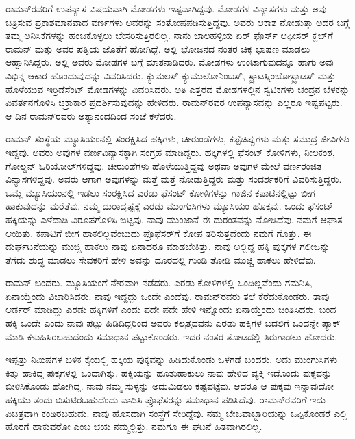 ರಾಮನ್‍ರವರಿಗೆ ಉಪನ್ಯಾಸ ವಿಷಯವಾಗಿ ಮೋಡಗಳು ಇಷ್ಟವಾಗಿದ್ದವು. ಮೋಡಗಳ ವಿನ್ಯಾಸಗಳು ಮತ್ತು ಅವು ಚಿತ್ರಿಸುವ ಪ್ರಕಾಶಮಾನವಾದ ವರ್ಣಗಳು ಅವರನ್ನು ಸಂತೋಷ\-ಪಡಿಸುತ್ತಿದ್ದವು. ಅವರು ಆಕಾಶ ನೋಡುತ್ತಾ ಅದರ ಬಗ್ಗೆ ತಮ್ಮ ಅನಿಸಿಕೆಗಳನ್ನು ಹಂಚಿಕೊಳ್ಳಲು ಬೇಸರಿಸುತ್ತಿರಲಿಲ್ಲ. ನಾನು ಜಾಲಹಳ್ಳಿಯ ಏರ್ ಫೊರ್ಸ್ ಆಫೀಸರ್ ಕ್ಲಬ್‌ಗೆ ರಾಮನ್ ಮತ್ತು ಅವರ ಪತ್ನಿಯ ಜೊತೆಗೆ ಹೋಗಿದ್ದೆ. ಅಲ್ಲಿ ಭೋಜನದ ನಂತರ ಚಿಕ್ಕ ಭಾಷಣ ಮಾಡಲು ಆಹ್ವಾನಿಸಿದ್ದರು. ಅಲ್ಲಿ ಅವರು ಮೋಡಗಳ ಬಗ್ಗೆ ಮಾತನಾಡಿದರು. ಮೋಡಗಳು ಉಂಟಾಗುವುದನ್ನೂ ಹಾಗು ಅವು ವಿಭಿನ್ನ ಆಕಾರ ಹೊಂದುವುದನ್ನು ವಿವರಿಸಿದರು. ಕ್ಯುಮಲಸ್ ಕ್ಯುಮುಲೋನಿಂಬಸ್, ಸ್ಟ್ರಾಟಸ್\break ನಿಂಬೋಸ್ಟ್ರಾಟಸ್ ಮತ್ತು ಹೊಳೆಯುವ ಇರ್ರಿಡೆಸೆಂಟ್ ಮೋಡಗಳನ್ನು ವಿವರಿಸಿದರು. ಅತಿ ಎತ್ತರದ ಮೋಡಗಳಲ್ಲಿನ ಸ್ವಟಿಕಗಳು ಚಂದ್ರನ ಬೆಳಕನ್ನು ವಿವರ್ತನಗೊಳಿಸಿ ಚಕ್ರಾಕಾರ ಪ್ರದರ್ಶಿಸುವುದನ್ನು ಹೇಳಿದರು. ರಾಮನ್‌ರವರ ಉಪನ್ಯಾಸವನ್ನು ಎಲ್ಲರೂ ಇಷ್ಟಪಟ್ಟರು. ಆ ದಿನ ರಾಮನ್‌ರವರು ಅತ್ಯಾನಂದದಿಂದ ಸಂಜೆ ಕಳೆದರು. 

ರಾಮನ್ ಸಂಸ್ಥೆಯ ಮ್ಯೂಸಿಯಂನಲ್ಲಿ ಸಂರಕ್ಷಿಸಿದ ಹಕ್ಕಿಗಳು, ಚೀರುಂಡೆಗಳು, ಕಪ್ಪೆಚಿಪ್ಪುಗಳು ಮತ್ತು ಸಮುದ್ರ ಜೀವಿಗಳು ಇದ್ದವು. ಅವರು ಅವುಗಳ ವರ್ಣವಿನ್ಯಾಸಕ್ಕಾಗಿ ಸಂಗ್ರಹ ಮಾಡಿದ್ದರು. ಹಕ್ಕಿಗಳಲ್ಲಿ ಫೆಸಂಟ್ ಕೋಳಿಗಳು, ನೀಲಕಂಠ, ಗೋಲ್ಡನ್ ಓರಿಯೋಲ್‌ಗಳಿದ್ದವು. ಚೀರುಂಡೆಗಳು ಹೊಳೆಯುತ್ತಿದ್ದವು ಅಥವಾ ಅವುಗಳ ಮೇಲೆ ವರ್ಣರಂಜಿತ ವಿನ್ಯಾಸಗಳಿದ್ದವು. ಅವರು ಆಗಾಗ ಅವುಗಳನ್ನು ಮತ್ತೆ ಮತ್ತೆ ನೋಡುತ್ತಿದ್ದರು ಮತ್ತು ಸಂದರ್ಶಕರಿಗೆ ವಿವರಿಸುತ್ತಿದ್ದರು. ಒಮ್ಮೆ ಮ್ಯೂಸಿಯಂನಲ್ಲಿ ಇಡಲು ಸಂರಕ್ಷಿಸಿದ ಎರಡು ಫೆಸಂಟ್ ಕೋಳಿಗಳನ್ನು ಗಾಜಿನ ಕಪಾಟಿನಲ್ಲಿಟ್ಟು ಬೀಗ ಹಾಕುವುದನ್ನು ಮರೆತೆವು. ನಮ್ಮ ದುರಾದೃಷ್ಟಕ್ಕೆ ಎರಡು ಮುಂಗುಸಿಗಳು ಮ್ಯೂಸಿಯಂ ಹೊಕ್ಕವು. ಒಂದು ಫೆಸಂಟ್ ಹಕ್ಕಿಯನ್ನು ಎಳೆದಾಡಿ ವಿರೂಪಗೊಳಿಸಿ ಬಿಟ್ಟವು. ನಾವು ಮುಂಜಾನೆ ಈ ದುರಂತವನ್ನು ನೋಡಿದೆವು. ನಮಗೆ ಆಘಾತ ಆಯಿತು. ಕಪಾಟಿಗೆ ಬೀಗ ಹಾಕಲಿಲ್ಲವೆಂಬುದು ಪ್ರೊಫೆಸರ್‌ಗೆ ಕೋಪ ತರಿಸುತ್ತದೆಂದು ನಮಗೆ ಗೊತ್ತು. ಈ ದುರ್ಘಟನೆಯನ್ನು ಮುಚ್ಚಿ ಹಾಕಲು ನಾವು ಏನಾದರೂ ಮಾಡಬೇಕಿತ್ತು. ನಾವು ಅಲ್ಲಿದ್ದ ಹಕ್ಕಿ ಪುಕ್ಕಗಳ ಗಲೀಜನ್ನು ತೆಗೆದು ಶುದ್ಧ ಮಾಡಲು ಸೇವಕರಿಗೆ ಹೇಳಿ ಅವನ್ನು ದೂರದಲ್ಲಿ ಗುಂಡಿ ತೋಡಿ ಮುಚ್ಚಿ ಹಾಕಲು ಹೇಳಿದೆವು.

ರಾಮನ್ ಬಂದರು. ಮ್ಯೂಸಿಯಂಗೆ ನೇರವಾಗಿ ನಡೆದರು. ಎರಡು ಕೋಳಿಗಳಲ್ಲಿ ಒಂದಿಲ್ಲವೆಂದು ಗಮನಿಸಿ, ಏನಾಯ್ತೆಂದು ವಿಚಾರಿಸಿದರು. ನಾವು ಇದ್ದದ್ದು ಒಂದೇ ಎಂದೆವು. ರಾಮನ್‌ರವರು ತಲೆ ಕೆರೆದುಕೊಂಡರು. ತಾವು ಆರ್ಡರ್ ಮಾಡಿದ್ದು ಎರಡು ಹಕ್ಕಿಗಳಿಗೆ ಎಂದು ಪದೇ ಪದೇ ಹೇಳಿ ಇನ್ನೊಂದು ಏನಾಯ್ತೆಂದು ಚಿಂತಿಸಿದರು. ಬಂದ ಹಕ್ಕಿ ಒಂದೇ ಎಂದು ನಾವು ಪಟ್ಟು ಹಿಡಿದಿದ್ದರಿಂದ ಅವರು ಕಲ್ಕತ್ತದವನು ಎರಡು ಹಕ್ಕಿಗಳ ಬದಲಿಗೆ ಒಂದನ್ನೇ ಪ್ಯಾಕ್ ಮಾಡಿ ಕಳುಹಿಸಿರಬಹುದೆಂದು ಸಮಾಧಾನ ಪಟ್ಟುಕೊಂಡರು. ಇದರ ನಂತರ ತೋಟದಲ್ಲಿ ತಿರುಗಾಡಲು ಹೋದರು.

ಇಪ್ಪತ್ತು ನಿಮಿಷಗಳ ಬಳಿಕ ಕೈಯಲ್ಲಿ ಹಕ್ಕಿಯ ಪುಕ್ಕವನ್ನು ಹಿಡಿದುಕೊಂಡು ಒಳಗಡೆ ಬಂದರು. ಅದು ಮುಂಗುಸಿಗಳು ಕಿತ್ತು ಹಾಕಿದ್ದ ಪುಕ್ಕಗಳಲ್ಲಿ ಒಂದಾಗಿತ್ತು. ಹಕ್ಕಿಯನ್ನು ಹೂತುಹಾಕುಲು ನಾವು ಹೇಳಿದ ವ್ಯಕ್ತಿ ಇದೊಂದು ಪುಕ್ಕವನ್ನು ಬೀಳಿಸಿಕೊಂಡು ಹೋಗಿದ್ದ. ನಾವು ನಮ್ಮ ಸುಳ್ಳನ್ನು ಅದುಮಿಡಲು ಕಷ್ಟಪಟ್ಟೆವು. ಆದರೂ ಆ ಪುಕ್ಕವು ಇನ್ನಾವುದೋ ಹಕ್ಕಿಯು ತಂದು ಬಿಸುಟಿರಬಹುದೆಂದು ವಾದಿಸಿ ಪ್ರೊಫೆಸರನ್ನು ಸಮಾಧಾನ ಪಡಿಸಿದೆವು. ರಾಮನ್‍ರವರಿಗೆ ಇದು ವಿಚಿತ್ರವಾಗಿ ಕಂಡಿರಬಹುದು. ನಾವು ಹೊಸದಾಗಿ ಸಂಸ್ಥೆಗೆ ಸೇರಿದ್ದೆವು. ನಮ್ಮ ಬೇಜವಾಬ್ದಾರಿಯನ್ನು ಒಪ್ಪಿಕೊಂಡರೆ ಎಲ್ಲಿ ಹೊರಗೆ ಹಾಕುವರೋ ಎಂಬ ಭಯ ನಮ್ಮಲ್ಲಿತ್ತು. ನಮಗೂ ಈ ಘಟನೆ ಹಿತವಾಗಿರಲಿಲ್ಲ.


